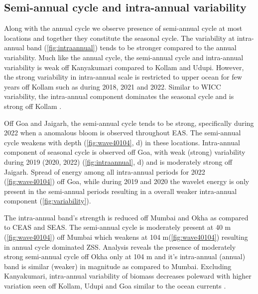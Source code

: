 \documentclass{article}
\begin{document}
	\subsection{Semi-annual cycle and intra-annual variability}
	\label{sec:intraannualvar}
	Along with the annual cycle we observe presence of semi-annual cycle at most locations and together they constitute the seasonal cycle. The variability at intra-annual band (\cref{fig:intraannual})  tends to be stronger compared to the annual variability. Much like the annual cycle, the semi-annual cycle and intra-annual variability is weak off Kanyakumari compared to Kollam and Udupi. However, the strong variability in intra-annual scale is restricted to upper ocean for few years off Kollam such as during 2018, 2021 and 2022. Similar to WICC variability, the intra-annual component dominates the seasonal cycle and is strong off Kollam \citep{chaudhuri2020observed}.
	
	Off Goa and Jaigarh, the semi-annual cycle tends to be strong, specifically during 2022 when a anomalous bloom is observed throughout EAS. The semi-annual cycle weakens with depth (\cref{fig:wave40104}, d) in these locations. Intra-annual component of seasonal cycle is observed off Goa, with weak (strong) variability during  2019 (2020, 2022) (\cref{fig:intraannual}, d) and is moderately strong off Jaigarh. Spread of energy among all intra-annual periods for 2022 (\cref{fig:wave40104}) off Goa, while during 2019 and 2020 the wavelet energy is only present in the semi-annual periods resulting in a overall weaker intra-annual component (\cref{fig:variability}).
	
	The intra-annual band's strength is reduced off Mumbai and Okha as compared to CEAS and SEAS. The semi-annual cycle is moderately present at 40 m (\cref{fig:wave40104}) off Mumbai which weakens at 104 m(\cref{fig:wave40104}) resulting in annual cycle dominated ZSS. Analysis reveals the presence of moderately strong semi-annual cycle off Okha only at 104 m and it's intra-annual (annual) band is similar (weaker) in magnitude as compared to Mumbai. Excluding Kanyakumari, intra-annual variability of biomass decreases poleward with higher variation seen off Kollam, Udupi and Goa similar to the ocean currents \citep{amol2014observed,chaudhuri2020observed,chaudhuri2021observed}.
	
	
\end{document}
